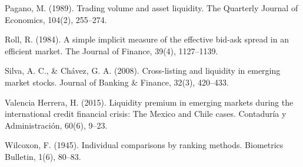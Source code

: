 \begin{referencias}
Pagano, M. (1989). Trading volume and asset liquidity. The Quarterly Journal of Economics, 104(2), 255--274.

Roll, R. (1984). A simple implicit measure of the effective bid-ask spread in an efficient market. The Journal of Finance, 39(4), 1127--1139.

Silva, A. C., \& Chávez, G. A. (2008). Cross-listing and liquidity in emerging market stocks. Journal of Banking \& Finance, 32(3), 420--433.

Valencia Herrera, H. (2015). Liquidity premium in emerging markets during the international credit financial crisis: The Mexico and Chile cases. Contaduría y Administración, 60(6), 9--23.

Wilcoxon, F. (1945). Individual comparisons by ranking methods. Biometrics Bulletin, 1(6), 80--83.

\end{referencias}
